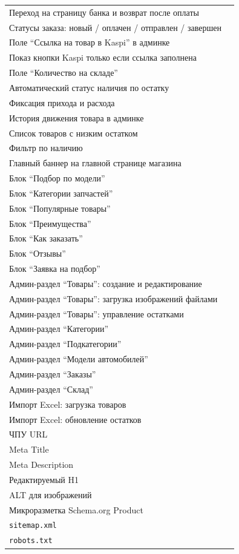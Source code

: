 \documentclass[12pt,a4paper]{article}
\newcommand{\done}{\ding{51}}
\newcommand{\notdone}{\ding{113}}
\begin{document}
\begin{longtable}{>{\raggedright\arraybackslash}p{} >{\centering\arraybackslash}p{}}
Переход на страницу банка и возврат после оплаты & \notdone \\
Статусы заказа: новый / оплачен / отправлен / завершен & \done \\

Поле ``Ссылка на товар в Kaspi'' в админке & \done \\
Показ кнопки Kaspi только если ссылка заполнена & \done \\

Поле ``Количество на складе'' & \done \\
Автоматический статус наличия по остатку & \done \\
Фиксация прихода и расхода & \done \\
История движения товара в админке & \done \\
Список товаров с низким остатком & \done \\
Фильтр по наличию & \done \\

Главный баннер на главной странице магазина & \done \\
Блок ``Подбор по модели'' & \done \\
Блок ``Категории запчастей'' & \done \\
Блок ``Популярные товары'' & \done \\
Блок ``Преимущества'' & \done \\
Блок ``Как заказать'' & \done \\
Блок ``Отзывы'' & \done \\
Блок ``Заявка на подбор'' & \done \\

Админ-раздел ``Товары'': создание и редактирование & \done \\
Админ-раздел ``Товары'': загрузка изображений файлами & \notdone \\
Админ-раздел ``Товары'': управление остатками & \done \\
Админ-раздел ``Категории'' & \done \\
Админ-раздел ``Подкатегории'' & \done \\
Админ-раздел ``Модели автомобилей'' & \done \\
Админ-раздел ``Заказы'' & \done \\
Админ-раздел ``Склад'' & \done \\
Импорт Excel: загрузка товаров & \done \\
Импорт Excel: обновление остатков & \done \\

ЧПУ URL & \done \\
Meta Title & \done \\
Meta Description & \done \\
Редактируемый H1 & \done \\
ALT для изображений & \done \\
Микроразметка Schema.org Product & \done \\
\texttt{sitemap.xml} & \done \\
\texttt{robots.txt} & \done \\


\end{longtable}
\end{document}
